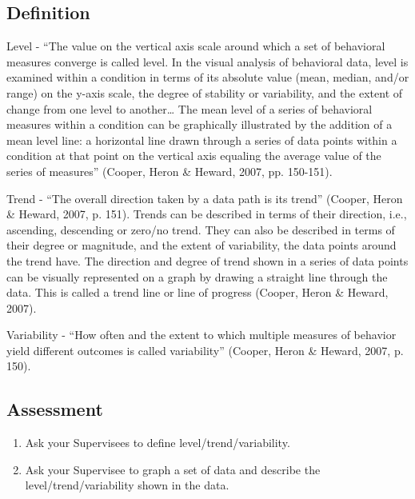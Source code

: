 \subsection{Definition}
Level - ``The value on the vertical axis scale around which a set of behavioral measures converge is called level. In the visual analysis of behavioral data, level is examined within a condition in terms of its absolute value (mean, median, and/or range) on the y-axis scale, the degree of stability or variability, and the extent of change from one level to another… The mean level of a series of behavioral measures within a condition can be graphically illustrated by the addition of a mean level line: a horizontal line drawn through a series of data points within a condition at that point on the vertical axis equaling the average value of the series of measures'' (Cooper, Heron \& Heward, 2007, pp. 150-151). 

Trend - ``The overall direction taken by a data path is its trend'' (Cooper, Heron \& Heward, 2007, p. 151). Trends can be described in terms of their direction, i.e., ascending, descending or zero/no trend. They can also be described in terms of their degree or magnitude, and the extent of variability, the data points around the trend have. The direction and degree of trend shown in a series of data points can be visually represented on a graph by drawing a straight line through the data. This is called a trend line or line of progress (Cooper, Heron \& Heward, 2007).

Variability - ``How often and the extent to which multiple measures of behavior yield different outcomes is called variability'' (Cooper, Heron \& Heward, 2007, p. 150).
%
\subsection{Assessment}
\begin{enumerate}
\item Ask your Supervisees to define level/trend/variability.
\item Ask your Supervisee to graph a set of data and describe the level/trend/variability shown in the data.
\end{enumerate}
%
